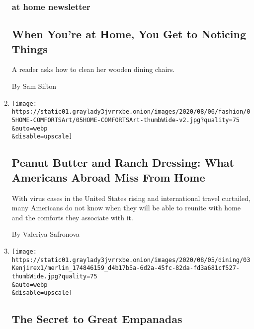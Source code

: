 \begin{enumerate}
  \hypertarget{at-home-newsletter-1}{%
  \subsubsection{at home newsletter}\label{at-home-newsletter-1}}

  \hypertarget{when-youre-at-home-you-get-to-noticing-things}{%
  \subsection{When You're at Home, You Get to Noticing
  Things}\label{when-youre-at-home-you-get-to-noticing-things}}

  A reader asks how to clean her wooden dining chairs.

  By Sam Sifton
\item
  \href{/2020/08/05/style/american-comfort-foods-peanut-butter-ranch-dressing-hot-cheetos.html}{}

  \texttt{[image: https://static01.graylady3jvrrxbe.onion/images/2020/08/06/fashion/05HOME-COMFORTSArt/05HOME-COMFORTSArt-thumbWide-v2.jpg?quality=75\\\&auto=webp\\\&disable=upscale]}

  \hypertarget{peanut-butter-and-ranch-dressing-what-americans-abroad-miss-from-home}{%
  \subsection{Peanut Butter and Ranch Dressing: What Americans Abroad
  Miss From
  Home}\label{peanut-butter-and-ranch-dressing-what-americans-abroad-miss-from-home}}

  With virus cases in the United States rising and international travel
  curtailed, many Americans do not know when they will be able to
  reunite with home and the comforts they associate with it.

  By Valeriya Safronova
\item
  \href{/2020/08/05/dining/the-secret-to-great-empanadas.html}{}

  \texttt{[image: https://static01.graylady3jvrrxbe.onion/images/2020/08/05/dining/03Kenjirex1/merlin\_174846159\_d4b17b5a-6d2a-45fc-82da-fd3a681cf527-thumbWide.jpg?quality=75\\\&auto=webp\\\&disable=upscale]}

  \hypertarget{the-secret-to-great-empanadas}{%
  \subsection{The Secret to Great
  Empanadas}\label{the-secret-to-great-empanadas}}


\end{enumerate}
